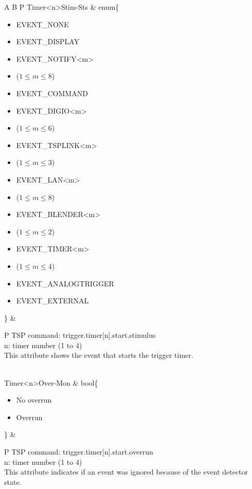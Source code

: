 \documentclass[openany]{article}
\begin{document}
\begin{longtable}{A B P}
		Timer{\textless n\textgreater}Stim-Sts & enum\{\begin{itemize}[noitemsep]
					\small
					\item[] EVENT\_NONE
					\item[] EVENT\_DISPLAY
					\item[] EVENT\_NOTIFY\textless m\textgreater
					\item[] ($1\leq m\leq 8$)
					\item[] EVENT\_COMMAND
					\item[] EVENT\_DIGIO\textless m\textgreater
					\item[] ($1\leq m\leq 6$)
					\item[] EVENT\_TSPLINK\textless m\textgreater
					\item[] ($1\leq m\leq 3$)
					\item[] EVENT\_LAN\textless m\textgreater
					\item[] ($1\leq m\leq 8$)
					\item[] EVENT\_BLENDER\textless m\textgreater 
					\item[] ($1\leq m\leq 2$)
					\item[] EVENT\_TIMER\textless m\textgreater
					\item[] ($1\leq m\leq 4$)
					\item[] EVENT\_ANALOGTRIGGER
					\item[] EVENT\_EXTERNAL
				\end{itemize}\} & 
				\begin{tabular}{P}
					TSP command: trigger.timer[n].start.stimulus \\
					n: timer number (1 to 4) \\
					This attribute shows the event that starts the trigger timer.
				\end{tabular} \\ \hline
		Timer{\textless n\textgreater}Over-Mon & bool\{\begin{itemize}[noitemsep]
					\small
					\item[] No overrun
					\item[] Overrun
				\end{itemize}\} & 
				\begin{tabular}{P}
					TSP command: trigger.timer[n].start.overrun \\
					n: timer number (1 to 4) \\
					This attribute indicates if an event was ignored because of the event detector state.
				\end{tabular} \\ \hline

\end{longtable}
\end{document}
